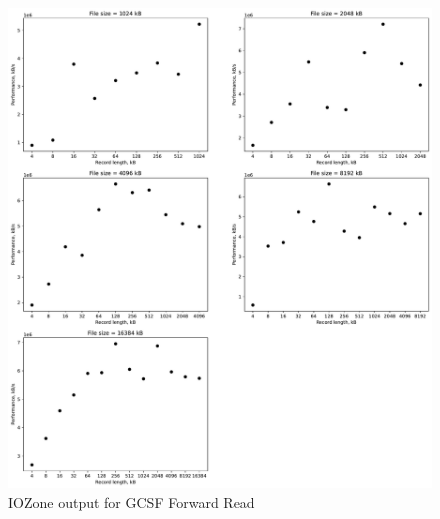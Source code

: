 \begin{figure}[!htb]
	\label{fig:app_bgcsfh_ffs_read}
	\begin{center}
		\includegraphics[width=1.0\textwidth]{figures/benchmarking/gcsf/Read.pdf}
	\end{center}
	\caption{IOZone output for \gls{GCSF} Forward Read}
\end{figure}

